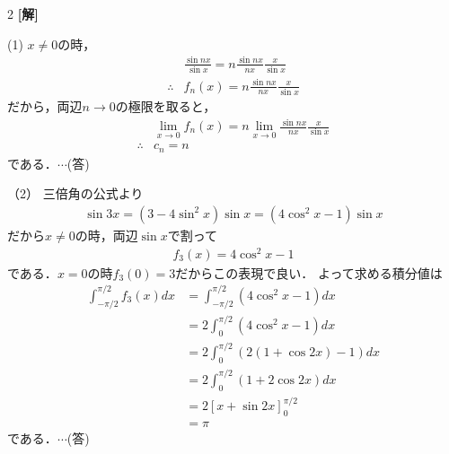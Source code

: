 \documentclass[../../../../main.tex]{subfiles}
\begin{document}
\setcounter{equation}{0}
\begin{oframed}
    
\end{oframed}
\setlength{\columnseprule}{0.4pt}
\begin{multicols}{2}
    {\bf[解]}

    (1)
    $x \neq 0$の時，
    \begin{align*}
         & \frac{\sin nx}{\sin x} = n\frac{\sin nx}{nx}\frac{x}{\sin x } \\
        \therefore
         & f_{n}(x) = n\frac{\sin nx}{nx}\frac{x}{\sin x }
    \end{align*}
    だから，両辺$n\to 0$の極限を取ると，
    \begin{align*}
         & \lim_{x\to 0}f_{n}(x) = n \lim_{x\to 0} \frac{\sin nx}{nx}\frac{x}{\sin x } \\
        \therefore
         & c_{n} = n
    \end{align*}
    である．$\cdots$(答)

    \vspace{10pt}
    （2）
    三倍角の公式より
    \begin{align*}
        \sin 3x = (3-4\sin^2 x)\sin x = (4\cos^2 x - 1)\sin x
    \end{align*}
    だから$x\neq 0$の時，両辺$\sin x$で割って
    \begin{align*}
        f_3(x) = 4\cos^2 x - 1
    \end{align*}
    である．$x=0$の時$f_3(0)=3$だからこの表現で良い．
    よって求める積分値は
    \begin{align*}
        \int_{-\pi/2}^{\pi/2} f_3(x) dx
         & = \int_{-\pi/2}^{\pi/2} (4\cos^2 x - 1) dx \\
         & = 2\int_{0}^{\pi/2} (4\cos^2 x - 1) dx     \\
         & = 2\int_{0}^{\pi/2} (2(1+\cos 2x) - 1) dx  \\
         & = 2\int_{0}^{\pi/2} (1+2\cos 2x) dx        \\
         & = 2\left[x + \sin 2x\right]_{0}^{\pi/2}    \\
         & = \pi
    \end{align*}
    である．$\cdots$(答)


\end{multicols}
\end{document}
